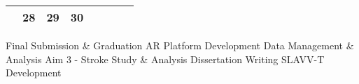 {\begin{tabularx}{\linewidth}{|l!{\vrule width \myLenLineThicknessThick}*{7}{@{}X@{}|}}
      
        \\  \hline 
      
    
  
  
  
  \hyperlink{week-2026-39}{} &
    
      
      
        \begin{minipage}[t]{6mm}\centering{}28\end{minipage}
      
       & 
    
      
      
        \begin{minipage}[t]{6mm}\centering{}29\end{minipage}
      
       & 
    
      
      
        \begin{minipage}[t]{6mm}\centering{}30\end{minipage}
      
       & 
    
      
      
       & 
    
      
      
       & 
    
      
      
       & 
    
      
      
      
        \\  \hline 
      
    
  
  
  \end{tabularx}
}
\vfill{\centering{} \small{Final Submission \& Graduation}\hspace{1.5em} \small{AR Platform Development}\hspace{1.5em} \small{Data Management \& Analysis}\hspace{1.5em} \small{Aim 3 - Stroke Study \& Analysis}\hspace{1.5em} \small{Dissertation Writing}\hspace{1.5em} \small{SLAVV-T Development}\hspace{1.5em}\par}

